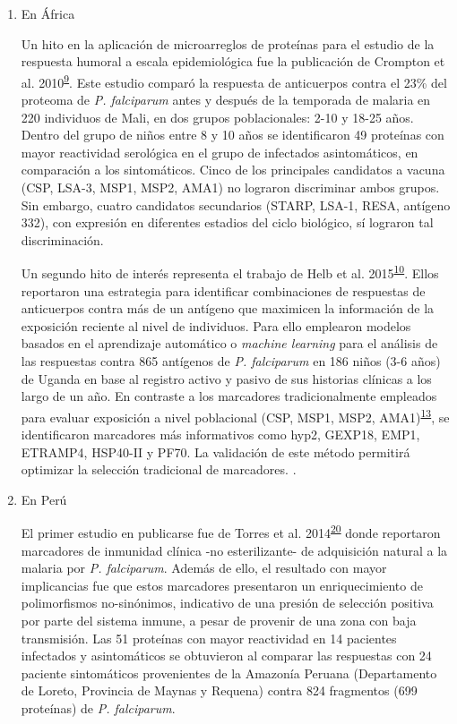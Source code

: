 \documentclass[a4paper]{article}
\begin{document}
\begin{enumerate}
\def\labelenumi{\alph{enumi}.}
\item
  En África

  Un hito en la aplicación de microarreglos de proteínas para el estudio
  de la respuesta humoral a escala epidemiológica fue la publicación de
  Crompton et al.
  2010\textsuperscript{\protect\hyperlink{ref-crompton2010}{9}}. Este
  estudio comparó la respuesta de anticuerpos contra el 23\% del
  proteoma de \emph{P. falciparum} antes y después de la temporada de
  malaria en 220 individuos de Mali, en dos grupos poblacionales: 2-10 y
  18-25 años. Dentro del grupo de niños entre 8 y 10 años se
  identificaron 49 proteínas con mayor reactividad serológica en el
  grupo de infectados asintomáticos, en comparación a los sintomáticos.
  Cinco de los principales candidatos a vacuna (CSP, LSA-3, MSP1, MSP2,
  AMA1) no lograron discriminar ambos grupos. Sin embargo, cuatro
  candidatos secundarios (STARP, LSA-1, RESA, antígeno 332), con
  expresión en diferentes estadios del ciclo biológico, sí lograron tal
  discriminación.

  Un segundo hito de interés representa el trabajo de Helb et al.
  2015\textsuperscript{\protect\hyperlink{ref-Helb2015exposure}{10}}.
  Ellos reportaron una estrategia para identificar combinaciones de
  respuestas de anticuerpos contra más de un antígeno que maximicen la
  información de la exposición reciente al nivel de individuos. Para
  ello emplearon modelos basados en el aprendizaje automático o
  \emph{machine learning} para el análisis de las respuestas contra 865
  antígenos de \emph{P. falciparum} en 186 niños (3-6 años) de Uganda en
  base al registro activo y pasivo de sus historias clínicas a los largo
  de un año. En contraste a los marcadores tradicionalmente empleados
  para evaluar exposición a nivel poblacional (CSP, MSP1, MSP2,
  AMA1)\textsuperscript{\protect\hyperlink{ref-elliott2014}{13}}, se
  identificaron marcadores más informativos como hyp2, GEXP18, EMP1,
  ETRAMP4, HSP40-II y PF70. La validación de este método permitirá
  optimizar la selección tradicional de marcadores. .
\item
  En Perú

  El primer estudio en publicarse fue de Torres et al.
  2014\textsuperscript{\protect\hyperlink{ref-Torres2014asymptomatic}{20}}
  donde reportaron marcadores de inmunidad clínica -no esterilizante- de
  adquisición natural a la malaria por \emph{P. falciparum}. Además de
  ello, el resultado con mayor implicancias fue que estos marcadores
  presentaron un enriquecimiento de polimorfismos no-sinónimos,
  indicativo de una presión de selección positiva por parte del sistema
  inmune, a pesar de provenir de una zona con baja transmisión. Las 51
  proteínas con mayor reactividad en 14 pacientes infectados y
  asintomáticos se obtuvieron al comparar las respuestas con 24 paciente
  sintomáticos provenientes de la Amazonía Peruana (Departamento de
  Loreto, Provincia de Maynas y Requena) contra 824 fragmentos (699
  proteínas) de \emph{P. falciparum}.


\end{enumerate}
\end{document}
